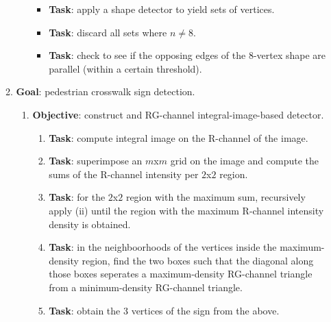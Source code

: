 \documentclass{article}
\begin{document}
\begin{itemize}
\begin{enumerate}
\begin{enumerate}
      \begin{itemize} 
       \item \textbf{Task}: apply a shape detector to yield sets of vertices.
       \item \textbf{Task}: discard all sets where $n \neq 8$.
       \item \textbf{Task}: check to see if the opposing edges of the 8-vertex
                   shape are parallel (within a certain threshold).
      \end{itemize} 
    \end{enumerate} 
    \item \textbf{Goal}: pedestrian crosswalk sign detection.
     \begin{enumerate} 
     \item \textbf{Objective}: construct and RG-channel integral-image-based detector.
      \begin{enumerate}
       \item \textbf{Task}: compute integral image on the R-channel of the image. 
       \item \textbf{Task}: superimpose an $m$x$m$ grid on the image and compute the
                   sums of the R-channel intensity per $2$x$2$ region.
       \item \textbf{Task}: for the $2$x$2$ region with the maximum sum, recursively
                   apply (ii) until the region with the maximum R-channel
                   intensity density  is obtained.
       \item \textbf{Task}: in the neighboorhoods of the vertices inside the
                   maximum-density region, find the two boxes such that the
                   diagonal along those boxes seperates a maximum-density
                   RG-channel triangle from a minimum-density RG-channel
                   triangle.
       \item \textbf{Task}: obtain the 3 vertices of the sign from the above.
      \end{enumerate} 
    \end{enumerate} 
  \end{enumerate} 
\end{itemize}
\end{document}
